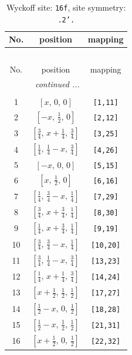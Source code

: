 \documentclass[fleqn,8pt]{jsarticle}
\begin{document}
\begin{longtable}{ccc}
\caption{Wyckoff site: {\tt 16f}, site symmetry: {\tt .2'.}}
 \\
 \hline \hline
No. & position & mapping \\ \hline \endfirsthead

\multicolumn{2}{l}{\tablename\ \thetable{}} \\
 \hline \hline
No. & position & mapping \\ \hline \endhead

 \hline \hline
\multicolumn{2}{r}{\footnotesize\it continued ...} \\ \endfoot

 \hline \hline
\multicolumn{2}{r}{} \\ \endlastfoot

1 & $\left[ x,\, 0,\, 0 \right]$ & {\tt [1,11]} \\ \hline
2 & $\left[ - x,\, \frac{1}{2},\, 0 \right]$ & {\tt [2,12]} \\ \hline
3 & $\left[ \frac{3}{4},\, x + \frac{1}{4},\, \frac{3}{4} \right]$ & {\tt [3,25]} \\ \hline
4 & $\left[ \frac{1}{4},\, \frac{1}{4} - x,\, \frac{3}{4} \right]$ & {\tt [4,26]} \\ \hline
5 & $\left[ - x,\, 0,\, 0 \right]$ & {\tt [5,15]} \\ \hline
6 & $\left[ x,\, \frac{1}{2},\, 0 \right]$ & {\tt [6,16]} \\ \hline
7 & $\left[ \frac{1}{4},\, \frac{3}{4} - x,\, \frac{1}{4} \right]$ & {\tt [7,29]} \\ \hline
8 & $\left[ \frac{3}{4},\, x + \frac{3}{4},\, \frac{1}{4} \right]$ & {\tt [8,30]} \\ \hline
9 & $\left[ \frac{1}{4},\, x + \frac{3}{4},\, \frac{1}{4} \right]$ & {\tt [9,19]} \\ \hline
10 & $\left[ \frac{3}{4},\, \frac{3}{4} - x,\, \frac{1}{4} \right]$ & {\tt [10,20]} \\ \hline
11 & $\left[ \frac{3}{4},\, \frac{1}{4} - x,\, \frac{3}{4} \right]$ & {\tt [13,23]} \\ \hline
12 & $\left[ \frac{1}{4},\, x + \frac{1}{4},\, \frac{3}{4} \right]$ & {\tt [14,24]} \\ \hline
13 & $\left[ x + \frac{1}{2},\, \frac{1}{2},\, \frac{1}{2} \right]$ & {\tt [17,27]} \\ \hline
14 & $\left[ \frac{1}{2} - x,\, 0,\, \frac{1}{2} \right]$ & {\tt [18,28]} \\ \hline
15 & $\left[ \frac{1}{2} - x,\, \frac{1}{2},\, \frac{1}{2} \right]$ & {\tt [21,31]} \\ \hline
16 & $\left[ x + \frac{1}{2},\, 0,\, \frac{1}{2} \right]$ & {\tt [22,32]} \\
\end{longtable}
\end{document}
